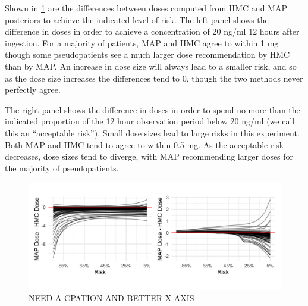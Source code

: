 Shown in \cref{fig:fig7} are the differences between doses computed from HMC and MAP posteriors to achieve the indicated level of risk.  The left panel shows the difference in doses in order to achieve a concentration of 20 ng/ml 12 hours after ingestion. For a majority of patients, MAP and HMC agree to within 1 mg though some pseudopatients see a much larger dose recommendation by HMC than by MAP.  An increase in dose size will always lead to a smaller risk, and so as the dose size increases the differences tend to 0, though the two methods never perfectly agree.

The right panel shows the difference in doses in order to spend no more than the indicated proportion of the 12 hour observation period below 20 ng/ml (we call this an “acceptable risk”).  Small dose sizes lead to large risks in this experiment.  Both MAP and HMC tend to agree to within 0.5 mg.  As the acceptable risk decreases, dose sizes tend to diverge, with MAP recommending larger doses for the majority of pseudopatients.

\begin{figure}
	\centering
	\includegraphics[width=\linewidth]{figs/experiments}
	\caption{NEED A CPATION AND BETTER X AXIS}
	\label{fig:fig7}
\end{figure}



